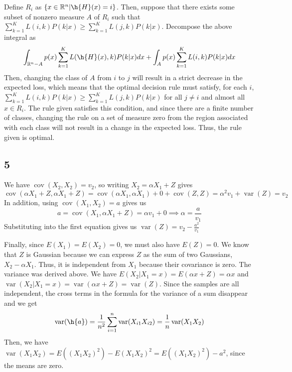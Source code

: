 \documentclass{article}
\DeclareMathOperator{\cov}{cov}
\DeclareMathOperator{\var}{var}
\newcommand{\rn}{\mathbb{R}}
\begin{document}
Define $R_i$ as $\{x\in\rn^n|\h{H}(x)=i\}$. Then, suppose that there exists some subset of nonzero measure $A$ of $R_i$ such that $\sum_{k=1}^KL(i, k)P(k|x)\ge\sum_{k=1}^KL(j, k)P(k|x)$. Decompose the above integral as
\[\int_{\rn^n-A}p(x)\sum_{k=1}^KL(\h{H}(x), k)P(k|x)dx+\int_Ap(x)\sum_{k=1}^KL(i, k)P(k|x)dx\]
Then, changing the class of $A$ from $i$ to $j$ will result in a strict decrease in the expected loss, which means that the optimal decision rule must satisfy, for each $i$, $\sum_{k=1}^KL(i, k)P(k|x)\ge\sum_{k=1}^KL(j, k)P(k|x)$ for all $j\neq i$ and almost all $x\in R_i$. The rule given satisfies this condition, and since there are a finite number of classes, changing the rule on a set of measure zero from the region associated with each class will not result in a change in the expected loss. Thus, the rule given is optimal.
\subsection*{5}
We have $\cov(X_2,X_2)=v_2$, so writing $X_2=\alpha X_1+Z$ gives
\[\cov(\alpha X_1+Z, \alpha X_1+Z)=\cov(\alpha X_1, \alpha X_1)+0+\cov(Z, Z)=\alpha^2v_1+\var(Z)=v_2\]
In addition, using $\cov(X_1, X_2)=a$ gives us
\[a=\cov(X_1, \alpha X_1+Z)=\alpha v_1+0\implies \alpha=\frac{a}{v_1}\]
Substituting into the first equation gives us $\var(Z)=v_2-\frac{a^2}{v_1}$

Finally, since $E(X_1)=E(X_2)=0$, we must also have $E(Z)=0$.
We know that $Z$ is Gaussian because we can express $Z$ as the sum of two Gaussians, $X_2-\alpha X_1$. Thus, it is independent from $X_1$ because their covariance is zero. The variance was derived above.
We have $E(X_2|X_1=x)=E(\alpha x+Z)=\alpha x$ and $\var(X_2|X_1=x)=\var(\alpha x+Z)=\var(Z)$. 
Since the samples are all independent, the cross terms in the formula for the variance of a sum disappear and we get
\[\var(\h{a})=\frac{1}{n^2}\sum_{i=1}^n\var(X_{i1}X_{i2})=\frac{1}{n}\var(X_1X_2)\]
Then, we have $\var(X_1X_2)=E((X_1X_2)^2)-E(X_1X_2)^2=E((X_1X_2)^2)-a^2$, since the means are zero.
\end{document}
